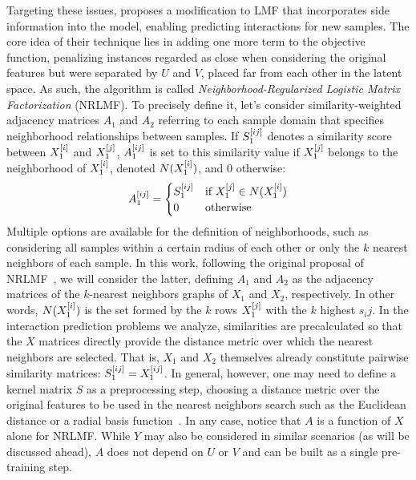 \begin{apendicesenv}
Targeting these issues,  proposes a modification to LMF that incorporates side information into the model, enabling predicting interactions for new samples.
%
The core idea of their technique lies in adding one more term to the objective function, penalizing instances regarded as close when considering the original features but were separated by $U$ and $V$, placed far from each other in the latent space. As such, the algorithm is called \emph{Neighborhood-Regularized Logistic Matrix Factorization} (NRLMF).
%
To precisely define it, let's consider similarity-weighted adjacency matrices $A_1$ and $A_2$ referring to each sample domain that specifies neighborhood relationships between samples. If $S_1^{[ij]}$ denotes a similarity score between $X_1^{[i]}$ and $X_1^{[j]}$, $A_1^{[ij]}$ is set to this similarity value if $X_1^{[j]}$ belongs to the neighborhood of $X_1^{[i]}$, denoted $N(X_1^{[i]})$, and 0 otherwise:
%
\begin{equation}
    A_1^{[ij]} =
    \begin{cases}
        S_1^{[ij]} & \text{if } X_1^{[j]} \in N(X_1^{[i]})\\
        0 & \text{otherwise}
    \end{cases}
    \label{eq:nrlmf_A}
\end{equation}
%
Multiple options are available for the definition of neighborhoods, such as considering all samples within a certain radius of each other or only the $k$ nearest neighbors of each sample. In this work, following the original proposal of NRLMF~\cite{liu2016neighborhood}, we will consider the latter, defining $A_1$ and $A_2$ as the adjacency matrices of the $k$-nearest neighbors graphs of $X_1$ and $X_2$, respectively. In other words, $N(X_1^{[i]})$ is the set formed by the $k$ rows $X_1^{[j]}$ with the $k$ highest $s_ij$. In the interaction prediction problems we analyze, similarities are precalculated so that the $X$ matrices directly provide the distance metric over which the nearest neighbors are selected. That is, $X_1$ and $X_2$ themselves already constitute pairwise similarity matrices: $S_1^{[ij]} = X_1^{[ij]}$. In general, however, one may need to define a kernel matrix $S$ as a preprocessing step, choosing a distance metric over the original features to be used in the nearest neighbors search such as the Euclidean distance or a radial basis function~\cite{vanlaarhoven2011gaussian}. In any case, notice that $A$ is a function of $X$ alone for NRLMF. While $Y$ may also be considered in similar scenarios (as will be discussed ahead), $A$ does not depend on $U$ or $V$ and can be built as a single pre-training step.


\end{apendicesenv}
